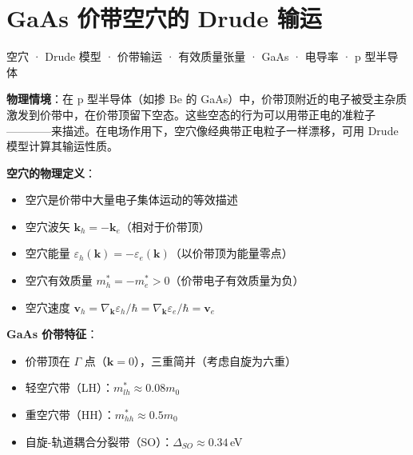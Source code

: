 
\section{GaAs 价带空穴的 Drude 输运}
\label{sec:gaas-hole-drude}

\begin{tipbox}[关键词标签]
空穴 · Drude 模型 · 价带输运 · 有效质量张量 · GaAs · 电导率 · p 型半导体
\end{tipbox}

\begin{modelbox}[模型：p 型半导体中空穴的经典输运]
\textbf{物理情境}：在 p 型半导体（如掺 Be 的 GaAs）中，价带顶附近的电子被受主杂质激发到价带中，在价带顶留下空态。这些空态的行为可以用带正电的准粒子————来描述。在电场作用下，空穴像经典带正电粒子一样漂移，可用 Drude 模型计算其输运性质。

\textbf{空穴的物理定义}：
\begin{itemize}[nosep]
    \item 空穴是价带中大量电子集体运动的等效描述
    \item 空穴波矢 $\mathbf{k}_h=-\mathbf{k}_e$（相对于价带顶）
    \item 空穴能量 $\varepsilon_h(\mathbf{k})=-\varepsilon_e(\mathbf{k})$（以价带顶为能量零点）
    \item 空穴有效质量 $m_h^*=-m_e^*>0$（价带电子有效质量为负）
    \item 空穴速度 $\mathbf{v}_h=\nabla_{\mathbf{k}}\varepsilon_h/\hbar=\nabla_{\mathbf{k}}\varepsilon_e/\hbar=\mathbf{v}_e$
\end{itemize}

\textbf{GaAs 价带特征}：
\begin{itemize}[nosep]
    \item 价带顶在 $\Gamma$ 点（$\mathbf{k}=0$），三重简并（考虑自旋为六重）
    \item 轻空穴带（LH）：$m_{lh}^*\approx0.08m_0$
    \item 重空穴带（HH）：$m_{hh}^*\approx0.5m_0$
    \item 自旋-轨道耦合分裂带（SO）：$\Delta_{SO}\approx0.34\,$eV
\end{itemize}
\end{modelbox}


